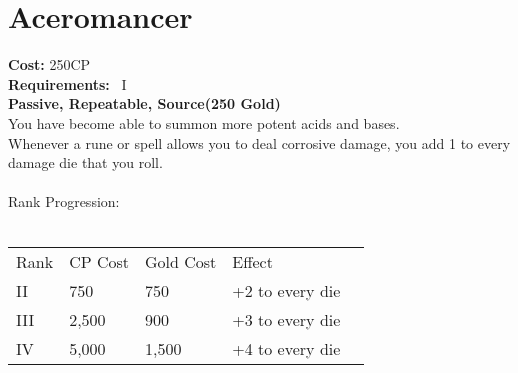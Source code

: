 \section{Aceromancer}\label{perk:aceromancer}
\textbf{Cost:} 250CP\\
\textbf{Requirements:}~ I\\
\textbf{Passive, Repeatable, Source(250 Gold)}\\
You have become able to summon more potent acids and bases.\\
Whenever a rune or spell allows you to deal corrosive damage, you add 1 to every damage die that you roll.\\
\\
Rank Progression:\\
\\
\begin{longtable}{l | l | l | l | l}
    Rank & CP Cost & Gold Cost &  Effect\\
    II & 750 & 750 & +2 to every die\\
    III & 2,500 & 900 & +3 to every die\\
    IV & 5,000 & 1,500 & +4 to every die\\
\end{longtable}